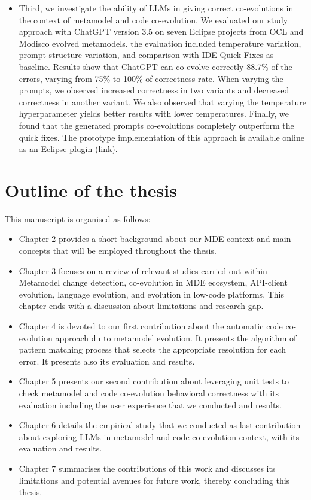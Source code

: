 \begin{itemize}[label=]
	\item Third, we investigate the ability of LLMs in giving correct co-evolutions in the context of metamodel and code co-evolution. We evaluated our study approach with ChatGPT version 3.5 on seven Eclipse projects
		from OCL and Modisco evolved metamodels. the evaluation included temperature variation, prompt structure variation, and comparison with IDE Quick Fixes as baseline. Results show that ChatGPT can co-evolve correctly 88.7\% of the errors, varying from 75\% to 100\% of correctness rate. When varying the prompts, we observed increased
		correctness in two variants and decreased correctness in another variant. We also observed that varying the temperature
		hyperparameter yields better results with lower temperatures. Finally, we found that the generated prompts co-evolutions completely outperform the quick fixes.  The prototype implementation of this approach is available online as an Eclipse plugin (link).


\end{itemize}


\section{Outline of the thesis}
This manuscript is organised as follows:
\begin{itemize}[label=\textbullet,font=\small]

\item Chapter 2 provides a short background about our MDE context and main concepts that will be employed throughout the thesis.
\item Chapter 3 focuses on a review of relevant studies carried out within Metamodel change detection, co-evolution in MDE ecosystem, API-client evolution, language evolution, and evolution in low-code platforms. This chapter ends with a discussion about limitations and research gap.
\item Chapter 4 is devoted to our first contribution about the automatic code co-evolution approach du to metamodel evolution. It presents the algorithm of pattern matching process that selects the appropriate resolution for each error. It presents also its evaluation and results.
\item Chapter 5 presents our second contribution about leveraging unit tests to check metamodel and code co-evolution behavioral correctness with its evaluation including the user experience that we conducted and results.
\item Chapter 6 details the empirical study that we conducted as last contribution about exploring LLMs in metamodel and code co-evolution context, with its evaluation and results.
\item Chapter 7 summarises the contributions of this work and discusses its limitations and  potential avenues for future work, thereby concluding this thesis.

\end{itemize}

